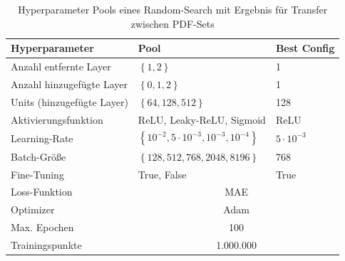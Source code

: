 \begin{table}
	\centering
	\begin{tabular}{lll}
		Hyperparameter & Pool & Best Config \\
		\hline\hline
		Anzahl entfernte Layer & $\left\lbrace  1, 2 \right\rbrace $ & 1 \\
		Anzahl hinzugefügte Layer & $\left\lbrace  0, 1, 2 \right\rbrace $ & 1 \\
		Units (hinzugefügte Layer) &$\left\lbrace 64, 128, 512\right\rbrace$ & 128\\
		Aktivierungsfunktion & ReLU, Leaky-ReLU, Sigmoid & ReLU \\
		Learning-Rate & $\left\lbrace 10^{-2}, 5 \cdot 10^{-3}, 10^{-3}, 10^{-4} \right\rbrace $ & $5 \cdot 10^{-3}$\\
		Batch-Größe & $\left\lbrace 128, 512, 768, 2048, 8196 \right\rbrace $ & 768\\
		Fine-Tuning & True, False & True \\
		\hline
		Loss-Funktion & \multicolumn{2}{c}{MAE} \\
		Optimizer & \multicolumn{2}{c}{Adam} \\
		Max. Epochen & \multicolumn{2}{c}{100}\\
		Trainingspunkte & \multicolumn{2}{c}{1.000.000} \\
	\end{tabular}
	\caption{Hyperparameter Pools eines Random-Search mit Ergebnis für Transfer zwischen PDF-Sets}
	\label{hyperparameter-transfer}
\end{table}
